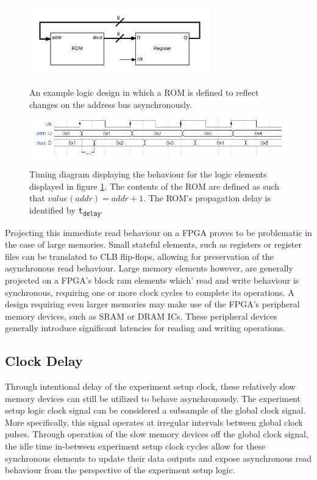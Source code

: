 \documentclass{article}
\begin{document}
\begin{figure}[h!]
    \centering
    \caption{An example logic design in which a ROM is defined to reflect changes on the address bus asynchronously. }
    \includegraphics[width=0.7\textwidth]{img/async-read}
    \label{fig:async-read}
\end{figure}


\begin{figure}[h!]
    \centering
    \caption{Timing diagram displaying the behaviour for the logic elements displayed in figure \ref{fig:async-read}. The contents of the ROM are defined as such that $value(addr) = addr + 1$. The ROM's propagation delay is identified by \texttt{t\textsubscript{delay}}.}
    \includegraphics[width=\textwidth]{img/mem-async}
    \label{fig:async-read-timing}
\end{figure}


Projecting this immediate read behaviour on a FPGA proves to be problematic in the case of large memories. Small stateful elements, such as registers or register files can be translated to CLB flip-flops, allowing for preservation of the asynchronous read behaviour. Large memory elements however, are generally projected on a FPGA's block ram elements which' read and write behaviour is synchronous, requiring one or more clock cycles to complete its operations. A design requiring even larger memories may make use of the FPGA's peripheral memory devices, such as SRAM or DRAM ICs. These peripheral devices generally introduce significant latencies for reading and writing operations. 

\subsection{Clock Delay}
\label{section:clock-delay}
Through intentional delay of the experiment setup clock, these relatively slow memory devices can still be utilized to behave asynchronously. The experiment setup logic clock signal can be considered a subsample of the global clock signal. More specifically, this signal operates at irregular intervals between global clock pulses. Through operation of the slow memory devices off the global clock signal, the idle time in-between experiment setup clock cycles allow for these synchronous elements to update their data outputs and expose asynchronous read behaviour from the perspective of the experiment setup logic.
\end{document}
